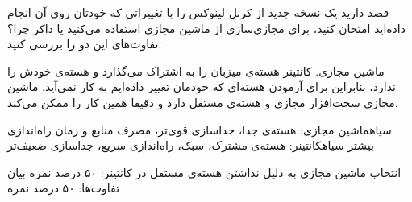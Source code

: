 
قصد دارید یک نسخه جدید از کرنل لینوکس را با تغییراتی که خودتان روی آن انجام داده‌اید امتحان کنید، برای مجازی‌سازی از ماشین مجازی استفاده می‌کنید یا داکر چرا؟ تفاوت‌های این دو را بررسی کنید.


\begin{پاسخ}

ماشین مجازی.
کانتینر هسته‌ی میزبان را به اشتراک می‌گذارد و هسته‌ی خودش را ندارد، بنابراین برای آزمودن هسته‌ای که خودمان تغییر داده‌ایم به کار نمی‌آید.
ماشین مجازی سخت‌افزار مجازی و هسته‌ی مستقل دارد و دقیقا همین کار را ممکن می‌کند.

 ‌سیاه{ماشین مجازی}: هسته‌ی جدا، جداسازی قوی‌تر، مصرف منابع و زمان راه‌اندازی بیشتر
 ‌سیاه{کانتینر}: هسته‌ی مشترک، سبک، راه‌اندازی سریع، جداسازی ضعیف‌تر

 انتخاب ماشین مجازی به دلیل نداشتن هسته‌ی مستقل در کانتینر: ۵۰ درصد نمره
 بیان تفاوت‌ها: ۵۰ درصد نمره

\end{پاسخ}
